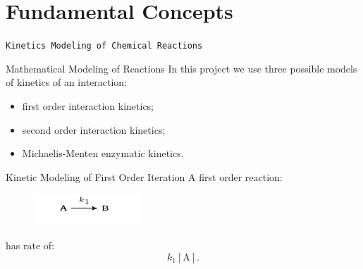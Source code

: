 \documentclass{beamer}
\begin{document}
\section{Fundamental Concepts}

\begin{frame}{}
\begin{center}
\texttt{Kinetics Modeling of Chemical Reactions}
\end{center}
\end{frame}

\begin{frame}{Mathematical Modeling of Reactions}
In this project we use three possible models of kinetics of an 
interaction:
\begin{itemize}
\pause
\item{first order interaction kinetics;}
\pause
\item{second order interaction kinetics;}
\pause
\item{Michaelis-Menten enzymatic kinetics.}
\end{itemize}
\end{frame}


\begin{frame}{Kinetic Modeling of First Order Iteration}
A first order reaction:
\begin{figure}
\includegraphics[scale=1.5]{fundamental_concepts/first_order_reaction.pdf}
\end{figure}
\pause
has rate of:
\begin{equation*}
k_1[\text{A}].
\end{equation*}
\end{frame}
\end{document}
